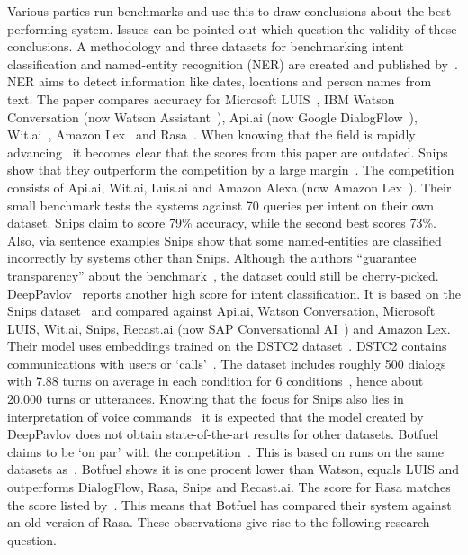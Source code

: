 Various parties run benchmarks and use this to draw conclusions about the best performing system.
Issues can be pointed out which question the validity of these conclusions.
A methodology and three datasets for benchmarking intent classification and named-entity recognition (NER) are created and published by~\citet{braun2017}.
NER aims to detect information like dates, locations and person names from text.
The paper compares accuracy for Microsoft LUIS~\citep{microsoft2019luis}, IBM Watson Conversation (now Watson Assistant~\citep{ibm2019assistant}), Api.ai (now Google DialogFlow~\citep{google2019dialogflow}), Wit.ai~\citep{facebook2019wit}, Amazon Lex~\citep{amazon2019lex} and Rasa~\citep{bocklisch2017rasa}.
When knowing that the field is rapidly advancing~\citep{young2018recent} it becomes clear that the scores from this paper are outdated.
Snips~\citep{snips2019voice} show that they outperform the competition by a large margin~\citep{snips2017benchmarking}.
The competition consists of Api.ai, Wit.ai, Luis.ai and Amazon Alexa (now Amazon Lex~\citep{amazon2019lex}).
Their small benchmark tests the systems against 70 queries per intent on their own dataset.
Snips claim to score 79\% accuracy, while the second best scores 73\%.
Also, via sentence examples Snips show that some named-entities are classified incorrectly by systems other than Snips.
Although the authors ``guarantee transparency'' about the benchmark~\citep{snips2017dataset}, the dataset could still be cherry-picked.
DeepPavlov~\citep{burtsev2018} reports another high score for intent classification.
It is based on the Snips dataset~\citep{snips2017dataset} and compared against Api.ai, Watson Conversation, Microsoft LUIS, Wit.ai, Snips, Recast.ai (now SAP Conversational AI~\citep{sap2019conversational}) and Amazon Lex.
Their model uses embeddings trained on the DSTC2 dataset~\citep{baymurzina2019classifiers,baymurzina2019intents}.
DSTC2 contains communications with users or `calls'~\citep{henderson2014second}.
The dataset includes roughly 500 dialogs with 7.88 turns on average in each condition for 6 conditions~\citep{henderson2014second}, hence about 20.000 turns or utterances.
Knowing that the focus for Snips also lies in interpretation of voice commands~\citep{snips2019voice} it is expected that the model created by DeepPavlov does not obtain state-of-the-art results for other datasets.
Botfuel~\citep{botfuel2019} claims to be `on par' with the competition~\citep{botfuel2018benchmark}.
This is based on runs on the same datasets as~\citet{braun2017}.
Botfuel shows it is one procent lower than Watson, equals LUIS and outperforms DialogFlow, Rasa, Snips and Recast.ai.
The score for Rasa matches the score listed by~\citet{braun2017}.
This means that Botfuel has compared their system against an old version of Rasa.
These observations give rise to the following research question.\\

